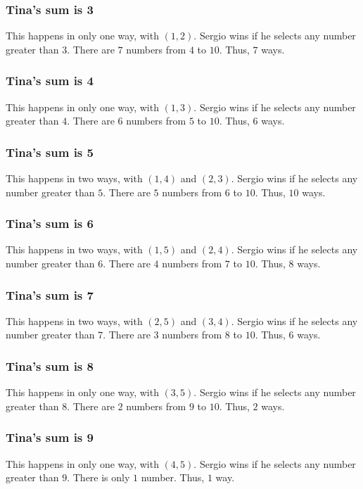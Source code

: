 \documentclass[12pt]{article}
\begin{document}
\begin{answer}
\subsubsection*{Tina's sum is 3}
This happens in only one way, with $(1,2)$. Sergio wins if he selects any number greater than $3$. There are $7$ numbers from $4$ to $10$. Thus, $7$ ways.

\subsubsection*{Tina's sum is 4}
This happens in only one way, with $(1,3)$. Sergio wins if he selects any number greater than $4$. There are $6$ numbers from $5$ to $10$. Thus, $6$ ways.

\subsubsection*{Tina's sum is 5}
This happens in two ways, with $(1,4)$ and $(2,3)$. Sergio wins if he selects any number greater than $5$. There are $5$ numbers from $6$ to $10$. Thus, $10$ ways.

\subsubsection*{Tina's sum is 6}
This happens in two ways, with $(1,5)$ and $(2,4)$. Sergio wins if he selects any number greater than $6$. There are $4$ numbers from $7$ to $10$. Thus, $8$ ways.

\subsubsection*{Tina's sum is 7}
This happens in two ways, with $(2,5)$ and $(3,4)$. Sergio wins if he selects any number greater than $7$. There are $3$ numbers from $8$ to $10$. Thus, $6$ ways.

\subsubsection*{Tina's sum is 8}
This happens in only one way, with $(3,5)$. Sergio wins if he selects any number greater than $8$. There are $2$ numbers from $9$ to $10$. Thus, $2$ ways.

\subsubsection*{Tina's sum is 9}
This happens in only one way, with $(4,5)$. Sergio wins if he selects any number greater than $9$. There is only $1$ number. Thus, $1$ way.


\end{answer}
\end{document}
